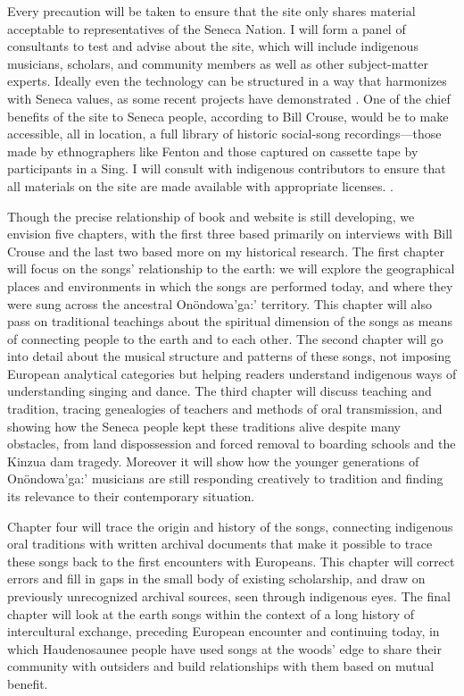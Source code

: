 \documentclass{neh}
\begin{document}
Every precaution will be taken to ensure that the site only shares material
acceptable to representatives of the Seneca Nation.
I will form a panel of consultants to test and advise about the site, which
will include indigenous musicians, scholars, and community members as well as
other subject-matter experts.
Ideally even the technology can be structured in a way that harmonizes with
Seneca values, as some recent projects have demonstrated
\Autocite{Christen:RelationshipsNotRecords}.
One of the chief benefits of the site to Seneca people, according to Bill
Crouse, would be to make accessible, all in location, a full library of
historic social-song recordings---those made by ethnographers like Fenton and
those captured on cassette tape by participants in a Sing.
I will consult with indigenous contributors to ensure that all materials on
the site are made available with appropriate licenses.
\Autocite{Christen:RelationshipsNotRecords}.

Though the precise relationship of book and website is still developing, we
envision five chapters, with the first three based primarily on interviews
with Bill Crouse and the last two based more on my historical research.
The first chapter will focus on the songs' relationship to the earth:
we will explore the geographical places and environments in which the songs
are performed today, and where they were sung across the ancestral
Onöndowa’ga:’ territory.
This chapter will also pass on traditional teachings about the spiritual
dimension of the songs as means of connecting people to the earth and to each
other.
The second chapter will go into detail about the musical structure and
patterns of these songs, not imposing European analytical categories but
helping readers understand indigenous ways of understanding singing and dance.
The third chapter will discuss teaching and tradition, tracing genealogies of
teachers and methods of oral transmission, and showing how the Seneca people
kept these traditions alive despite many obstacles, from land dispossession
and forced removal to boarding schools and the Kinzua dam tragedy.
Moreover it will show how the younger generations of Onöndowa'ga:' musicians
are still responding creatively to tradition and finding its relevance to
their contemporary situation.

Chapter four will trace the origin and history of the songs, connecting
indigenous oral traditions with written archival documents that make it
possible to trace these songs back to the first encounters with Europeans.
This chapter will correct errors and fill in gaps in the small body of
existing scholarship, and draw on previously unrecognized archival sources,
seen through indigenous eyes.
The final chapter will look at the earth songs within the context of a long
history of intercultural exchange, preceding European encounter and continuing
today, in which Haudenosaunee people have used songs at the woods' edge to
share their community with outsiders and build relationships with them based
on mutual benefit.
\end{document}
